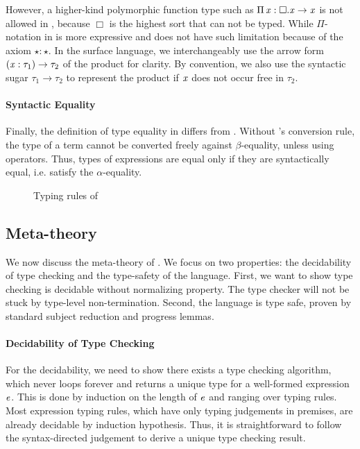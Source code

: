 However, a higher-kind polymorphic function type such as $\Pi \, \mathit{x}  :  \Box  .  \mathit{x}  \rightarrow  \mathit{x}$ is not allowed in \cc, because $\Box$ is
the highest sort that can not be typed. While $ \Pi $-notation in
\ecore is more expressive and does not have such limitation because of
the axiom $\star:\star$. In the surface language, we
interchangeably use the arrow form $(  \mathit{x}  :  \tau_{{\mathrm{1}}}  )  \rightarrow  \tau_{{\mathrm{2}}}$ of the product for
clarity. By convention, we also use the syntactic sugar $\tau_{{\mathrm{1}}}  \longrightarrow  \tau_{{\mathrm{2}}}$ to represent the product if $\mathit{x}$ does not occur free in
$\tau_{{\mathrm{2}}}$.

\paragraph{Syntactic Equality}
Finally, the definition of type equality in \ecore differs from
\cc. Without \cc's conversion rule, the type of a term cannot be
converted freely against $\beta$-equality, unless using \cast
operators. Thus, types of expressions are equal only if they are
syntactically equal, i.e. satisfy the $\alpha$-equality.

\begin{figure}
    \ottdefnctx{}\ottinterrule
    \ottdefnexpr{}
    \caption{Typing rules of \ecore}
    \label{fig:ecore:typing}
\end{figure}

\subsection{Meta-theory}\label{sec:ecore:meta}
We now discuss the meta-theory of \ecore. We focus on two properties: the
decidability of type checking and the type-safety of the language. First, we
want to show type checking \ecore is decidable without normalizing property.
The type checker will not be stuck by type-level non-termination. Second, the
language is type safe, proven by standard subject reduction and progress
lemmas.

\paragraph{Decidability of Type Checking}
For the decidability, we need to show there exists a type checking algorithm,
which never loops forever and returns a unique type for a well-formed
expression $\mathit{e}$. This is done by induction on the length of $\mathit{e}$ and
ranging over typing rules. Most expression typing rules, which have only typing
judgements in premises, are already decidable by induction hypothesis. Thus, it
is straightforward to follow the syntax-directed judgement to derive a unique
type checking result.

